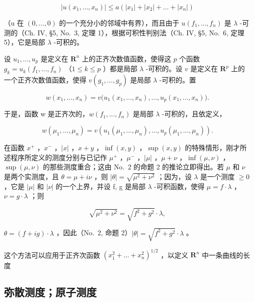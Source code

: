 \[
\left| u \left(x _ {1}, \dots , x _ {n}\right) \right| \leqslant a \left(\left| x _ {1} \right| + \left| x _ {2} \right| + \dots + \left| x _ {n} \right|\right)
\]

（u 在 \((0,\ldots,0)\) 的一个充分小的邻域中有界），而且由于 \(u(f_{1},\ldots,f_{n})\) 是 \(\lambda\) -可测的（Ch. IV, §5, No.~3, 定理 1），根据可积性判别法（Ch. IV, §5, No.~6, 定理 5），它是局部 \(\lambda\) -可积的。

设 \(u_1, \ldots, u_p\) 是定义在 \(\mathbf{R}^n\) 上的正齐次数值函数，使得这 \(p\) 个函数 \(g_k = u_k(f_1, \ldots, f_n)\) （\(1 \leqslant k \leqslant p\) ）都是局部 \(\lambda\) -可积的。设 \(v\) 是定义在 \(\mathbf{R}^p\) 上的一个正齐次数值函数，使得 \(v(g_1, \ldots, g_p)\) 是局部 \(\lambda\) -可积的。置

\[
w (x _ {1}, \ldots , x _ {n}) = v \big (u _ {1} (x _ {1}, \ldots , x _ {n}), \ldots , u _ {p} (x _ {1}, \ldots , x _ {n}) \big).
\]

于是，函数 w 是正齐次的，\(w(f_{1}, \ldots, f_{n})\) 是局部 \(\lambda\) -可积的，且依定义，

\[
w \left(\mu_ {1}, \dots , \mu_ {n}\right) = v \left(u _ {1} \left(\mu_ {1}, \dots , \mu_ {n}\right), \dots , u _ {p} \left(\mu_ {1}, \dots , \mu_ {n}\right)\right).
\]

在函数 \(x^{+}\) ，\(x^{-}\) ，\(|x|\) ，\(x + y\) ，\(\inf(x, y)\) ，\(\sup(x, y)\) 的特殊情形，刚才所述程序所定义的测度分别与已记作 \(\mu^{+}\) ，\(\mu^{-}\) ，\(|\mu|\) ，\(\mu + \nu\) ，\(\inf(\mu, \nu)\) ，\(\sup(\mu, \nu)\) 的那些测度重合；这由 No.~2 的命题 2 的推论立即得出。若 \(\mu\) 和 \(\nu\) 是两个实测度，且 \(\theta = \mu + i\nu\) ，则 \(|\theta| = \sqrt{\mu^{2} + \nu^{2}}\) ；因为，设 \(\lambda\) 是一个测度 \(\geqslant 0\) ，它是 \(|\mu|\) 和 \(|\nu|\) 的一个上界，并设 f, g 是局部 \(\lambda\) -可积函数，使得 \(\mu = f \cdot \lambda\) ，\(\nu = g \cdot \lambda\) ；则

\[
\sqrt {\mu^ {2} + \nu^ {2}} = \sqrt {f ^ {2} + g ^ {2}} \cdot \lambda ,
\]

\(\theta = (f + ig) \cdot \lambda\) ，因此（No.~2, 命题 2）\(|\theta| = \sqrt{f^2 + g^2} \cdot \lambda\) 。

这个方法可以应用于正齐次函数 \((x_1^2 +\ldots +x_n^2)^{1 / 2}\) ，以定义 \(\mathbf{R}^n\) 中一条曲线的长度

\subsection{弥散测度；原子测度}

